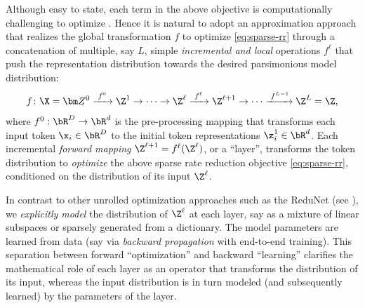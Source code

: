 \documentclass[../../book-main.tex]{subfiles}
\begin{document}
Although easy to state, each term in the above objective is computationally challenging to optimize \cite{Wright-Ma-2022}. Hence it is natural to adopt an approximation approach that realizes the global transformation $f$ to optimize 
\eqref{eq:sparse-rr} through a concatenation of multiple, say $L$, simple \textit{incremental and local} operations $f^\ell$ that push the representation distribution towards the desired parsimonious model distribution:
\begin{equation}
f\colon \X = \bm Z^0 \xrightarrow{\hspace{1mm} f^0 \hspace{1mm}} \Z^1 \rightarrow \cdots \rightarrow \Z^\ell \xrightarrow{\hspace{1mm} f^{\ell} \hspace{1mm}} \Z^{\ell+1} \rightarrow  \cdots \xrightarrow{\hspace{1mm} f^{L-1}} \Z^L = \Z,
\label{eq:incremental}
\end{equation}
where $f^0: \bR^{D} \rightarrow \bR^{d}$ is the pre-processing mapping that transforms each input token $\x_{i} \in \bR^{D}$ to the initial token representations $\z_{i}^{1} \in \bR^{d}$.  
Each incremental \textit{forward mapping} $\Z^{\ell + 1} = f^\ell(\Z^\ell)$, or a ``layer'', transforms the token distribution to \textit{optimize} the above sparse rate reduction objective \eqref{eq:sparse-rr}, conditioned on the distribution of its input $\Z^\ell$. 

\begin{remark}
    In contrast to other unrolled optimization approaches such as the ReduNet (see ), we \textit{explicitly model} the distribution of $\Z^\ell$ at each layer, say as a mixture of linear subspaces or sparsely generated from a dictionary. The model parameters are learned from data (say via \textit{backward propagation} with end-to-end training). This separation between forward ``optimization'' and backward
``learning'' clarifies the mathematical role of each layer as an operator
that transforms the distribution of its input, whereas the input distribution is in turn modeled (and subsequently learned) by the parameters of the layer. 
\end{remark}
\end{document}
